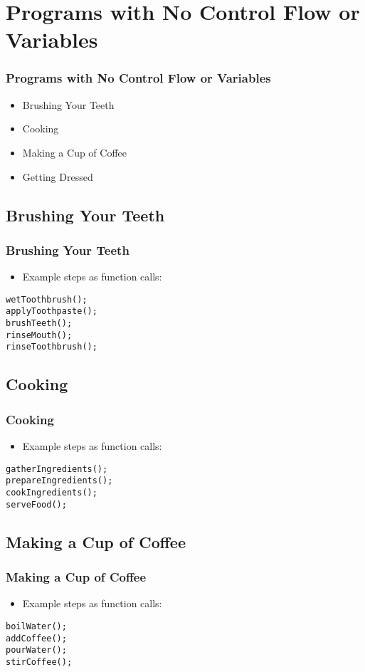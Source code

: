 \section{Programs with No Control Flow or Variables}
\begin{frame}
\frametitle{Programs with No Control Flow or Variables}
\begin{itemize}
    \item Brushing Your Teeth
    \item Cooking
    \item Making a Cup of Coffee
    \item Getting Dressed
\end{itemize}
\end{frame}

\subsection{Brushing Your Teeth}
\begin{frame}[fragile]
\frametitle{Brushing Your Teeth}
\begin{itemize}
    \item Example steps as function calls:
\end{itemize}
\begin{verbatim}
wetToothbrush();
applyToothpaste();
brushTeeth();
rinseMouth();
rinseToothbrush();
\end{verbatim}
\end{frame}

\subsection{Cooking}
\begin{frame}[fragile]
\frametitle{Cooking}
\begin{itemize}
    \item Example steps as function calls:
\end{itemize}
\begin{verbatim}
gatherIngredients();
prepareIngredients();
cookIngredients();
serveFood();
\end{verbatim}
\end{frame}

\subsection{Making a Cup of Coffee}
\begin{frame}[fragile]
\frametitle{Making a Cup of Coffee}
\begin{itemize}
    \item Example steps as function calls:
\end{itemize}
\begin{verbatim}
boilWater();
addCoffee();
pourWater();
stirCoffee();
\end{verbatim}
\end{frame}


